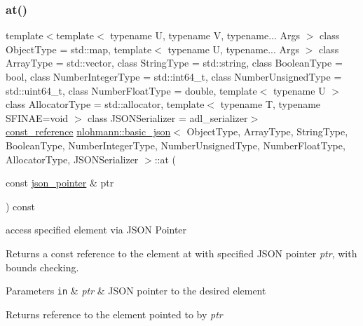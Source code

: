 \subsubsection{\texorpdfstring{at()}{at()}\hspace{0.1cm}{\footnotesize\ttfamily [6/6]}}
{\footnotesize\ttfamily template$<$template$<$ typename U, typename V, typename... Args $>$ class Object\+Type = std\+::map, template$<$ typename U, typename... Args $>$ class Array\+Type = std\+::vector, class String\+Type  = std\+::string, class Boolean\+Type  = bool, class Number\+Integer\+Type  = std\+::int64\+\_\+t, class Number\+Unsigned\+Type  = std\+::uint64\+\_\+t, class Number\+Float\+Type  = double, template$<$ typename U $>$ class Allocator\+Type = std\+::allocator, template$<$ typename T, typename S\+F\+I\+N\+A\+E=void $>$ class J\+S\+O\+N\+Serializer = adl\+\_\+serializer$>$ \\
\mbox{\hyperlink{classnlohmann_1_1basic__json_a4057c5425f4faacfe39a8046871786ca}{const\+\_\+reference}} \mbox{\hyperlink{classnlohmann_1_1basic__json}{nlohmann\+::basic\+\_\+json}}$<$ Object\+Type, Array\+Type, String\+Type, Boolean\+Type, Number\+Integer\+Type, Number\+Unsigned\+Type, Number\+Float\+Type, Allocator\+Type, J\+S\+O\+N\+Serializer $>$\+::at (\begin{DoxyParamCaption}\item[{const \mbox{\hyperlink{classnlohmann_1_1basic__json_a6886a5001f5b449ad316101a311ce536}{json\+\_\+pointer}} \&}]{ptr }\end{DoxyParamCaption}) const\hspace{0.3cm}{\ttfamily [inline]}}



access specified element via J\+S\+ON Pointer 

Returns a const reference to the element at with specified J\+S\+ON pointer {\itshape ptr}, with bounds checking.


\begin{DoxyParams}[1]{Parameters}
\mbox{\tt in}  & {\em ptr} & J\+S\+ON pointer to the desired element\\
\hline
\end{DoxyParams}
\begin{DoxyReturn}{Returns}
reference to the element pointed to by {\itshape ptr} 
\end{DoxyReturn}

